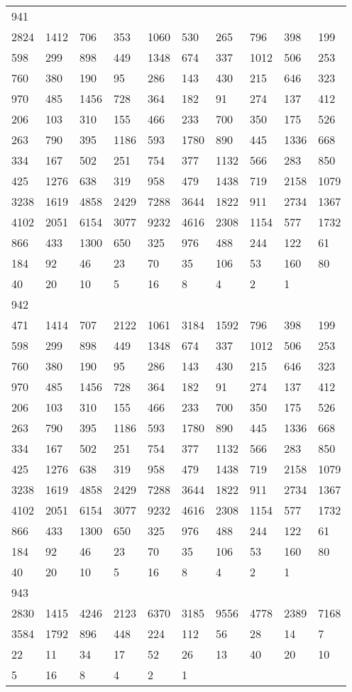 \begin{longtable}{*{10}{l}}
941&&&&&&&&&\\
2824& 1412& 706& 353& 1060& 530& 265& 796& 398& 199\\
598& 299& 898& 449& 1348& 674& 337& 1012& 506& 253\\
760& 380& 190& 95& 286& 143& 430& 215& 646& 323\\
970& 485& 1456& 728& 364& 182& 91& 274& 137& 412\\
206& 103& 310& 155& 466& 233& 700& 350& 175& 526\\
263& 790& 395& 1186& 593& 1780& 890& 445& 1336& 668\\
334& 167& 502& 251& 754& 377& 1132& 566& 283& 850\\
425& 1276& 638& 319& 958& 479& 1438& 719& 2158& 1079\\
3238& 1619& 4858& 2429& 7288& 3644& 1822& 911& 2734& 1367\\
4102& 2051& 6154& 3077& 9232& 4616& 2308& 1154& 577& 1732\\
866& 433& 1300& 650& 325& 976& 488& 244& 122& 61\\
184& 92& 46& 23& 70& 35& 106& 53& 160& 80\\
40& 20& 10& 5& 16& 8& 4& 2& 1& \\

942&&&&&&&&&\\
471& 1414& 707& 2122& 1061& 3184& 1592& 796& 398& 199\\
598& 299& 898& 449& 1348& 674& 337& 1012& 506& 253\\
760& 380& 190& 95& 286& 143& 430& 215& 646& 323\\
970& 485& 1456& 728& 364& 182& 91& 274& 137& 412\\
206& 103& 310& 155& 466& 233& 700& 350& 175& 526\\
263& 790& 395& 1186& 593& 1780& 890& 445& 1336& 668\\
334& 167& 502& 251& 754& 377& 1132& 566& 283& 850\\
425& 1276& 638& 319& 958& 479& 1438& 719& 2158& 1079\\
3238& 1619& 4858& 2429& 7288& 3644& 1822& 911& 2734& 1367\\
4102& 2051& 6154& 3077& 9232& 4616& 2308& 1154& 577& 1732\\
866& 433& 1300& 650& 325& 976& 488& 244& 122& 61\\
184& 92& 46& 23& 70& 35& 106& 53& 160& 80\\
40& 20& 10& 5& 16& 8& 4& 2& 1& \\

943&&&&&&&&&\\
2830& 1415& 4246& 2123& 6370& 3185& 9556& 4778& 2389& 7168\\
3584& 1792& 896& 448& 224& 112& 56& 28& 14& 7\\
22& 11& 34& 17& 52& 26& 13& 40& 20& 10\\
5& 16& 8& 4& 2& 1& \\


\end{longtable}

